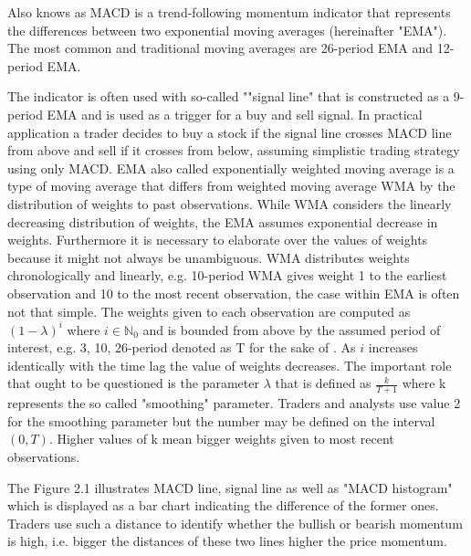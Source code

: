 Also knows as MACD is a trend-following momentum indicator that represents the differences between two exponential moving averages (hereinafter "EMA"). The most common and traditional moving averages are 26-period EMA and 12-period EMA. 

The indicator is often used with so-called ""signal line" that is constructed as a 9-period EMA and is used as a trigger for a buy and sell signal. In practical application a trader decides to buy a stock if the signal line crosses MACD line from above and sell if it crosses from below, assuming simplistic trading strategy using only MACD. EMA also called exponentially weighted moving average is a type of moving average that differs from weighted moving average WMA by the distribution of weights to past observations. While WMA considers the linearly decreasing distribution of weights, the EMA assumes exponential decrease in weights. Furthermore it is necessary to elaborate over the values of weights because it might not always be unambiguous. WMA distributes weights chronologically and linearly, e.g. 10-period WMA gives weight 1 to the earliest observation and 10 to the most recent observation, the case within EMA is often not that simple. The weights given to each observation are computed as $(1 - \lambda)^i$ where $i \in \mathbb{N}_0$ and is bounded from above by the assumed period of interest, e.g. 3, 10, 26-period denoted as T for the sake of . As $i$ increases identically with the time lag the value of weights decreases. The important role that ought to be questioned is the parameter $\lambda$ that is defined as $\frac{k}{T+1}$ where k represents the so called "smoothing" parameter. Traders and analysts use value 2 for the smoothing parameter but the number may be defined on the interval $(0,T)$. Higher values of k mean bigger weights given to most recent observations. 

The Figure 2.1 illustrates MACD line, signal line as well as "MACD histogram" which is displayed as a bar chart indicating the difference of the former ones. Traders use such a distance to identify whether the bullish or bearish momentum is high, i.e. bigger the distances of these two lines higher the price momentum.

